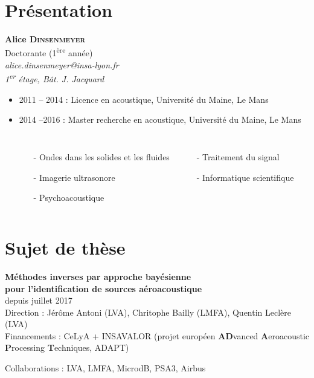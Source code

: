 \section{Présentation}


\begin{frame}
	\begin{center}
		\textbf{Alice \textsc{Dinsenmeyer}}\\
		\footnotesize{Doctorante (1\textsuperscript{ère} année)\\[0.5cm]
		\textit{alice.dinsenmeyer@insa-lyon.fr\\
		1\textsuperscript{er} étage, Bât. J. Jacquard}}
			
	\end{center}
	\begin{itemize}
		\item 2011 -- 2014 : Licence en acoustique, Université du Maine, Le Mans %
		\item 2014 --2016 : Master recherche en acoustique, Université du Maine, Le Mans %
		\begin{columns}
			\hspace{2cm}
			\begin{itemize}
				\item[-] Ondes dans les solides et les fluides
				\item[-] Imagerie ultrasonore
				\item[-] Psychoacoustique
			\end{itemize}
			\begin{itemize}
				\item[-] Traitement du signal
				\item[-] Informatique scientifique
			\end{itemize}
		\end{columns}
	\end{itemize}
\end{frame}

\section{Sujet de thèse}


\begin{frame}
	\centering
	\textbf{ Méthodes inverses par approche bayésienne \\pour l'identification de sources aéroacoustique}\\
	\footnotesize{depuis juillet 2017}\\[0.5cm]
	Direction : Jérôme Antoni (LVA), Chritophe Bailly (LMFA), Quentin Leclère (LVA)\\[0.5cm]
	Financements : CeLyA + INSAVALOR (projet européen \textbf{AD}vanced \textbf{A}eroacoustic \textbf{P}rocessing \textbf{T}echniques, ADAPT)

	Collaborations : LVA, LMFA, MicrodB, PSA3, Airbus
\end{frame}


